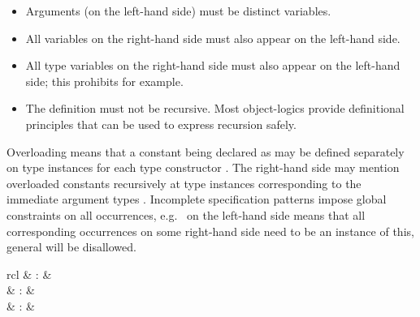 \begin{isabellebody}
\begin{isamarkuptext}
  \begin{itemize}

  \item Arguments (on the left-hand side) must be distinct variables.

  \item All variables on the right-hand side must also appear on the
  left-hand side.

  \item All type variables on the right-hand side must also appear on
  the left-hand side; this prohibits  for example.

  \item The definition must not be recursive.  Most object-logics
  provide definitional principles that can be used to express
  recursion safely.

  \end{itemize}

  Overloading means that a constant being declared as  may be defined separately on type instances  for each type constructor .  The right-hand side may mention overloaded constants
  recursively at type instances corresponding to the immediate
  argument types .  Incomplete
  specification patterns impose global constraints on all occurrences,
  e.g.\  on the left-hand side means that all
  corresponding occurrences on some right-hand side need to be an
  instance of this, general  will be disallowed.

  \begin{matharray}{rcl}
    \mbox{} & : &  \\
    \mbox{} & : &  \\
    \mbox{} & : &  \\
  \end{matharray}


\end{isamarkuptext}
\end{isabellebody}
